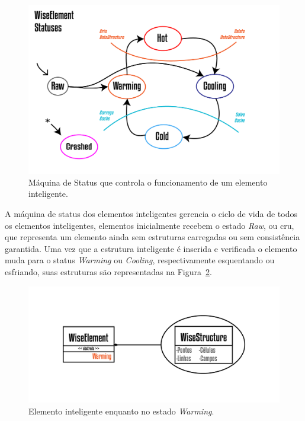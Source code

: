 \documentclass[a4paper,12pt]{monografia}
\theoremstyle{plain}
\theoremstyle{definition}
\theoremstyle{remark}
\begin{document}
\begin{figure}[!htbp]
	\centering
	\includegraphics[scale=1.5]{Figures/WiseElementStatus.png}
	\caption{Máquina de Status que controla o funcionamento de um elemento inteligente.}
	\label{fig3:wiselementstatus}
\end{figure}

A máquina de status dos elementos inteligentes gerencia o ciclo de vida de todos os elementos inteligentes, elementos inicialmente recebem o estado \textit{Raw}, ou cru, que representa um elemento ainda sem estruturas carregadas ou sem consistência garantida. Uma vez que a estrutura inteligente é inserida e verificada o elemento muda para o status \textit{Warming} ou \textit{Cooling}, respectivamente esquentando ou esfriando, suas estruturas são representadas na Figura~\ref{fig4:wiselementwarming}.

\begin{figure}[!htbp]
	\centering
	\includegraphics[scale=1]{Figures/WiseElementWarming.png}
	\caption{Elemento inteligente enquanto no estado \textit{Warming}.}
	\label{fig4:wiselementwarming}
\end{figure}
\end{document}

